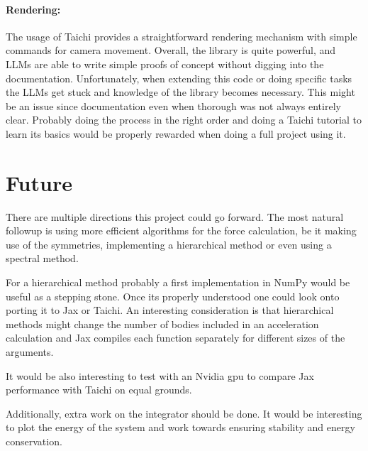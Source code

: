\documentclass[a4paper, 11pt]{article}         %
\begin{document}
\paragraph{Rendering:}
The usage of Taichi provides a straightforward rendering mechanism with simple commands for camera movement.
Overall, the library is quite powerful, and LLMs are able to write simple proofs of concept without digging into the documentation. Unfortunately, when extending this code or doing specific tasks the LLMs get stuck and knowledge of the library becomes necessary. This might be an issue since documentation even when thorough was not always entirely clear. Probably doing the process in the right order and doing a Taichi tutorial to learn its basics would be properly rewarded when doing a full project using it.


\section{Future}
There are multiple directions this project could go forward.
The most natural followup is using more efficient algorithms for the force calculation, be it making use of the symmetries, implementing a hierarchical method or even using a spectral method.

For a hierarchical method probably a first implementation in NumPy would be useful as a stepping stone. Once its properly understood one could look onto porting it to Jax or Taichi. An interesting consideration is that hierarchical methods might change the number of bodies included in an acceleration calculation and Jax compiles each function separately for different sizes of the arguments.


It would be also interesting to test with an Nvidia gpu to compare Jax performance with Taichi on equal grounds.

Additionally, extra work on the integrator should be done. It would be interesting to plot the energy of the system and work towards ensuring stability and energy conservation.

\printbibliography[heading=bibintoc]

\end{document}
